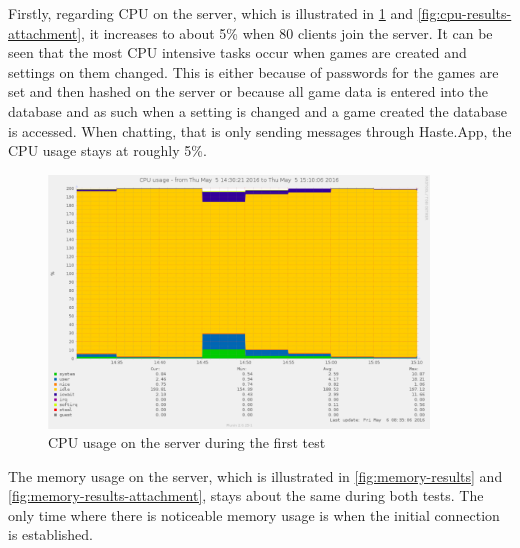\documentclass[a4paper]{article}
\begin{document}
Firstly, regarding CPU on the server, which is illustrated in \cref{fig:cpu-results} and \cref{fig:cpu-results-attachment}, it increases to about 5\% when 80 clients join the server. It can be seen that the most CPU intensive tasks occur when games are created and settings on them changed. This is either because of passwords for the games are set and then hashed on the server or because all game data is entered into the database and as such when a setting is changed and a game created the database is accessed. When chatting, that is only sending messages through Haste.App, the CPU usage stays at roughly 5\%.
\begin{figure}[ht!]
\centering
    \includegraphics[width=0.9\textwidth]{figure/serversidePerformance/2016-05-05-game-test-cpu2.png}
    \caption{CPU usage on the server during the first test}
    \label{fig:cpu-results}
\end{figure}

The memory usage on the server, which is illustrated in \cref{fig:memory-results} and \cref{fig:memory-results-attachment}, stays about the same during both tests. The only time where there is noticeable memory usage is when the initial connection is established. 
\end{document}
